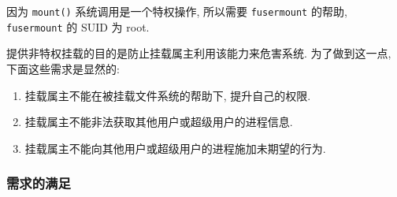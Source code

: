 \documentclass[nofonts, titlepage]{ctexart}
\begin{document}
因为 \texttt{mount()} 系统调用是一个特权操作, 所以需要
\texttt{fusermount} 的帮助, \texttt{fusermount} 的 SUID 为 root.

提供非特权挂载的目的是防止挂载属主利用该能力来危害系统. 为了做到这一点,
下面这些需求是显然的:

\begin{enumerate}
\def\labelenumi{\arabic{enumi}.}
\item
  挂载属主不能在被挂载文件系统的帮助下, 提升自己的权限.
\item
  挂载属主不能非法获取其他用户或超级用户的进程信息.
\item
  挂载属主不能向其他用户或超级用户的进程施加未期望的行为.
\end{enumerate}

\subsubsection{需求的满足}
\label{subsub:how_are_requirements_fulfilled}
\end{document}
